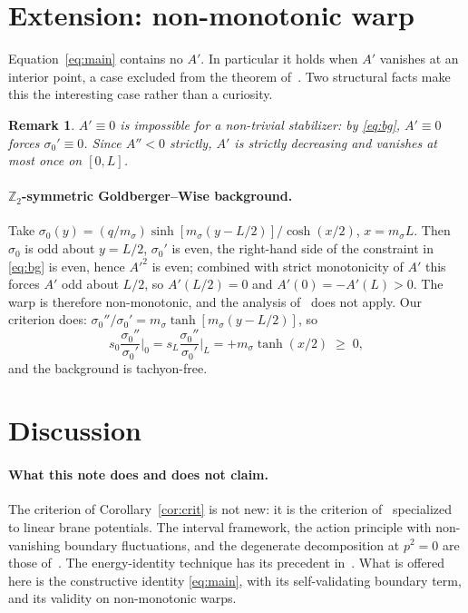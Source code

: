 \documentclass[11pt,a4paper]{article}
\newtheorem{remark}[theorem]{Remark}
\newcommand{\sig}{\sigma_0}
\begin{document}
\section{Extension: non-monotonic warp}
\label{sec:app}

Equation~\eqref{eq:main} contains no $A'$. In particular it holds when
$A'$ vanishes at an interior point, a case excluded from the theorem
of~\cite{LS}. Two structural facts make this the interesting case
rather than a curiosity.

\begin{remark}
$A'\equiv0$ is impossible for a non-trivial stabilizer: by
\eqref{eq:bg}, $A'\equiv0$ forces $\sig'\equiv0$. Since $A''<0$
strictly, $A'$ is strictly decreasing and vanishes at most once on
$[0,L]$.
\end{remark}

\paragraph{$\mathbb{Z}_2$-symmetric Goldberger--Wise background.}
Take $\sig(y)=(q/m_\sigma)\sinh[m_\sigma(y-L/2)]/\cosh(x/2)$,
$x=m_\sigma L$. Then $\sig$ is odd about $y=L/2$, $\sig'$ is even, the
right-hand side of the constraint in \eqref{eq:bg} is even, hence
$A'^2$ is even; combined with strict monotonicity of $A'$ this forces
$A'$ odd about $L/2$, so $A'(L/2)=0$ and $A'(0)=-A'(L)>0$. The warp is
therefore non-monotonic, and the analysis of~\cite{LS} does not apply.
Our criterion does: $\sig''/\sig'=m_\sigma\tanh[m_\sigma(y-L/2)]$, so
\begin{equation}
s_0\frac{\sig''}{\sig'}\Big|_{0}=s_L\frac{\sig''}{\sig'}\Big|_{L}
=+m_\sigma\tanh(x/2)\;\ge\;0,
\end{equation}
and the background is tachyon-free.

\section{Discussion}
\label{sec:disc}

\paragraph{What this note does and does not claim.}
The criterion of Corollary~\ref{cor:crit} is not new: it is the
criterion of~\cite{LS} specialized to linear brane potentials. The
interval framework, the action principle with non-vanishing boundary
fluctuations, and the degenerate decomposition at $p^2=0$ are those
of~\cite{CLP}. The energy-identity technique has its precedent
in~\cite{MK}. What is offered here is the constructive identity
\eqref{eq:main}, with its self-validating boundary term, and its
validity on non-monotonic warps.
\end{document}
